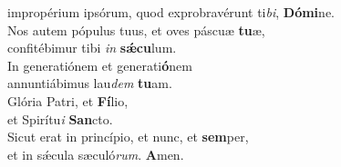 \oddverse impropérium ipsórum, quod exprobravérunt ti\textit{bi}, \textbf{Dó}\textbf{mi}ne.\\
\evenverse Nos autem pópulus tuus, et oves páscuæ \textbf{tu}æ,~\*\\
\evenverse confitébimur tibi \textit{in} \textbf{sǽ}\textbf{cu}lum.\\
\oddverse In generatiónem et generati\textbf{ó}nem~\*\\
\oddverse annuntiábimus lau\textit{dem} \textbf{tu}am.\\
\evenverse Glória Patri, et \textbf{Fí}lio,~\*\\
\evenverse et Spirítu\textit{i} \textbf{San}cto.\\
\oddverse Sicut erat in princípio, et nunc, et \textbf{sem}per,~\*\\
\oddverse et in sǽcula sæculó\textit{rum}. \textbf{A}men.\\
